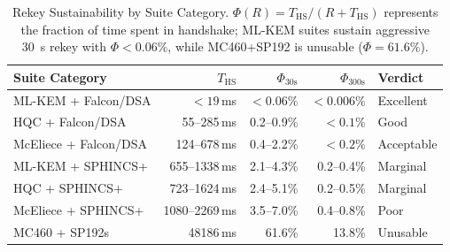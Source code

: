 \begin{table}[!t]
\centering
\caption{Rekey Sustainability by Suite Category.
$\Phi(R)\!=\!T_\text{HS}/(R+T_\text{HS})$ represents the fraction of
time spent in handshake; ML-KEM suites sustain aggressive \SI{30}{\second}
rekey with $\Phi<0.06\%$, while MC460+SP192 is unusable ($\Phi=61.6\%$).}
\label{tab:sched_rekey}
\footnotesize
\setlength{\tabcolsep}{3pt}
\begin{tabular}{@{}l r r r l@{}}
\toprule
\textbf{Suite Category}
& $T_\text{HS}$
& $\Phi_{30\text{s}}$
& $\Phi_{300\text{s}}$
& \textbf{Verdict} \\
\midrule
ML-KEM + Falcon/DSA
 & $<19$\,ms   & $<0.06\%$ & $<0.006\%$
 & \cellcolor{ptblue!8}Excellent \\
HQC + Falcon/DSA
 & 55--285\,ms & 0.2--0.9\% & $<0.1\%$
 & \cellcolor{ptblue!8}Good \\
McEliece + Falcon/DSA
 & 124--678\,ms& 0.4--2.2\% & $<0.2\%$
 & \cellcolor{ptgold!12}Acceptable \\
ML-KEM + SPHINCS+
 & 655--1338\,ms& 2.1--4.3\% & 0.2--0.4\%
 & \cellcolor{ptgold!12}Marginal \\
HQC + SPHINCS+
 & 723--1624\,ms& 2.4--5.1\% & 0.2--0.5\%
 & \cellcolor{ptgold!12}Marginal \\
McEliece + SPHINCS+
 & 1080--2269\,ms& 3.5--7.0\% & 0.4--0.8\%
 & \cellcolor{ptrose!12}Poor \\
MC460 + SP192s
 & 48186\,ms   & 61.6\% & 13.8\%
 & \cellcolor{ptrose!12}Unusable \\
\bottomrule
\end{tabular}
\end{table}

